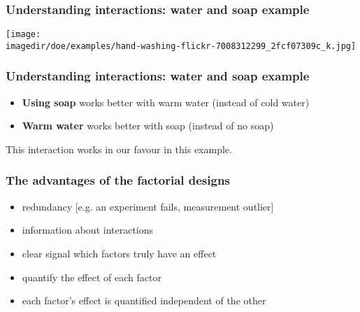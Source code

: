 \documentclass[11pt,aspectratio=169,mathserif]{beamer}
\begin{document}
\begin{frame}\frametitle{Understanding interactions: water and soap example}
	\begin{center}
		\texttt{[image: \\imagedir/doe/examples/hand-washing-flickr-7008312299\_2fcf07309c\_k.jpg]}
	\end{center}
	\vspace{-4cm}
\end{frame}
\begin{frame}\frametitle{Understanding interactions: water and soap example}
	
	\large
	\begin{itemize}
		\item	\textbf{Using soap} works better with warm water (instead of cold water)

		
		\vspace{24pt}
		\item	\textbf{Warm water} works better with soap (instead of no soap)
			
	\end{itemize}

	\vspace{24pt}
	This interaction works in our favour in this example.
\end{frame}
\begin{frame}\frametitle{The advantages of the factorial designs}
	\begin{itemize}
		\item	redundancy [e.g. an experiment fails, measurement outlier]
		
		\item	information about interactions
		
		\item	clear signal which factors truly have an effect 
		
		\item	quantify the effect of each factor
		
		\item 	each factor's effect is quantified independent of the other
	\end{itemize}
\end{frame}
\end{document}
